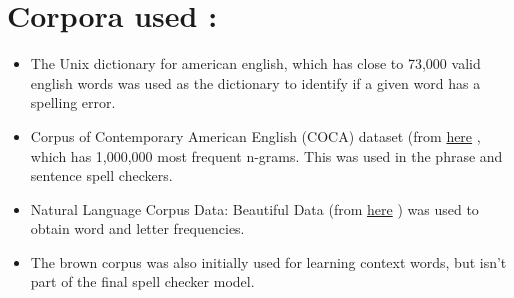 \section{Corpora used :}
\begin{itemize}

\item The Unix dictionary for american english, which has close to 73,000 valid english words was used as the dictionary to identify if a given word has a spelling error.

\item Corpus of Contemporary American English (COCA) dataset (from \href{http://www.ngrams.info/download_coca.asp}{here} , which has 1,000,000 most frequent n-grams. This was used in the phrase and sentence spell checkers.	

\item Natural Language Corpus Data: Beautiful Data (from \href{http://norvig.com/ngrams/}{here}
) was used to obtain word and letter frequencies.

\item The brown corpus was also initially used for learning context words, but isn't part of the final spell checker model.

\end{itemize}

